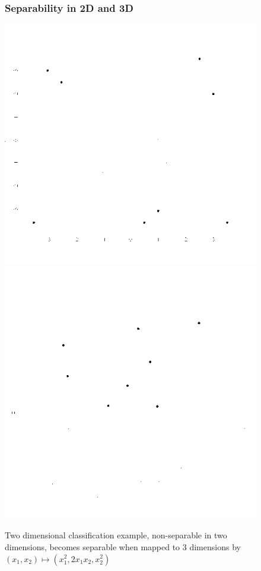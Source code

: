 \documentclass{beamer}
\begin{document}
\begin{frame}
\begin{figure}\frametitle{Separability in 2D and 3D}
\begin{center}\vskip-1cm
 \includegraphics[scale=0.3]{2d.png}
\includegraphics[scale=0.4]{3d.png}
\caption{Two dimensional classification example, non-separable in two
  dimensions, becomes separable when mapped to 3 dimensions by
  $(x_1,x_2) \mapsto (x_1^2, 2x_1x_2, x_2^2)$}
\end{center}
\end{figure}
\end{frame}
\end{document}
